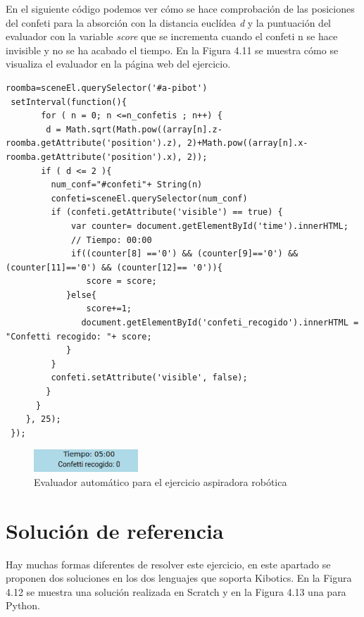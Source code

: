 En el siguiente código podemos ver cómo se hace comprobación de las posiciones del confeti para la absorción con la distancia euclídea \textit{d} y la puntuación del evaluador con la variable \textit{score} que se incrementa cuando el confeti n se hace invisible y no se ha acabado el tiempo. En la Figura 4.11 se muestra cómo se visualiza el evaluador en la página web del ejercicio.

\begin{lstlisting}
roomba=sceneEl.querySelector('#a-pibot')
 setInterval(function(){
       for ( n = 0; n <=n_confetis ; n++) {
        d = Math.sqrt(Math.pow((array[n].z-roomba.getAttribute('position').z), 2)+Math.pow((array[n].x-roomba.getAttribute('position').x), 2));
       if ( d <= 2 ){
         num_conf="#confeti"+ String(n)
         confeti=sceneEl.querySelector(num_conf)
         if (confeti.getAttribute('visible') == true) {
	         var counter= document.getElementById('time').innerHTML;
		     // Tiempo: 00:00	
	         if((counter[8] =='0') && (counter[9]=='0') && (counter[11]=='0') && (counter[12]== '0')){      
	 	        score = score;
		    }else{
	 	        score+=1;
		       document.getElementById('confeti_recogido').innerHTML = "Confetti recogido: "+ score;
		    }
         }
         confeti.setAttribute('visible', false);
        }
      }
    }, 25);
 });
\end{lstlisting}

 \begin{figure}[H]
  \centering
 \includegraphics[width=0.35\textwidth]{chapters/images/evaluadoraspiradora.png}
  \caption{Evaluador automático para el ejercicio aspiradora robótica}
\end{figure}
\section{Solución de referencia}

Hay muchas formas diferentes  de resolver este ejercicio, en este apartado se proponen dos soluciones en los dos lenguajes que soporta Kibotics. En la Figura 4.12 se muestra una solución realizada en Scratch y en la Figura 4.13 una para Python.

